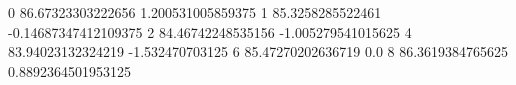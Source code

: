 0 86.67323303222656 1.200531005859375
1 85.3258285522461 -0.14687347412109375
2 84.46742248535156 -1.005279541015625
4 83.94023132324219 -1.532470703125
6 85.47270202636719 0.0
8 86.3619384765625 0.8892364501953125
